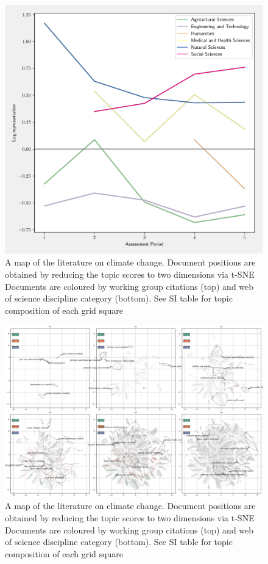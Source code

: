 \documentclass{article}
\begin{document}
\begin{figure}[h!]
	\begin{center}
		\includegraphics[width=0.85\linewidth]{plots/ipcc_representation/ipcc_rep_oecds_time.pdf}
		\caption{A map of the literature on climate change. Document positions are obtained by reducing the topic scores to two dimensions via t-SNE Documents are coloured by working group citations (top) and web of science discipline category (bottom). See SI table for topic composition of each grid square}
		\label{oecd_rep}
	\end{center}
\end{figure}

\begin{figure}[h!]
	\begin{center}
		\includegraphics[width=1\linewidth]{tsne_results/plots/run_1275_s_0_p100_evolution.png}
		\caption{A map of the literature on climate change. Document positions are obtained by reducing the topic scores to two dimensions via t-SNE Documents are coloured by working group citations (top) and web of science discipline category (bottom). See SI table for topic composition of each grid square}
		\label{map-double}
	\end{center}
\end{figure}
\end{document}
